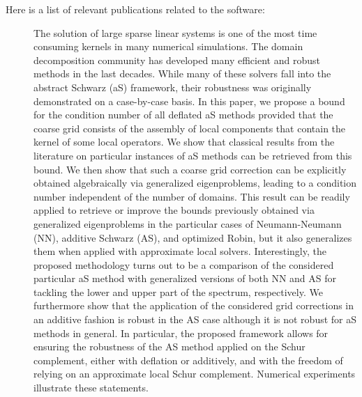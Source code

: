 Here is a list of relevant publications related to the software:
\begin{description}
        \item[]
        The solution of large sparse linear systems is one of the most time consuming kernels in many numerical simulations. The domain decomposition community has developed many efficient and robust methods in the last decades. While many of these solvers fall into the abstract Schwarz (aS) framework, their robustness was originally demonstrated on a case-by-case basis. In this paper, we propose a bound for the condition number of all deflated aS methods provided that the coarse grid consists of the assembly of local components that contain the kernel of some local operators. We show that classical results from the literature on particular instances of aS methods can be retrieved from this bound. We then show that such a coarse grid correction can be explicitly obtained algebraically via generalized eigenproblems, leading to a condition number independent of the number of domains. This result can be readily applied to retrieve or improve the bounds previously obtained via generalized eigenproblems in the particular cases of Neumann-Neumann (NN), additive Schwarz (AS), and optimized Robin, but it also generalizes them when applied with approximate local solvers. Interestingly, the proposed methodology turns out to be a comparison of the considered particular aS method with generalized versions of both NN and AS for tackling the lower and upper part of the spectrum, respectively. We furthermore show that the application of the considered grid corrections in an additive fashion is robust in the AS case although it is not robust for aS methods in general. In particular, the proposed framework allows for ensuring the robustness of the AS method applied on the Schur complement, either with deflation or additively, and with the freedom of relying on an approximate local Schur complement. Numerical experiments illustrate these statements.
    \item[]

\end{description}
